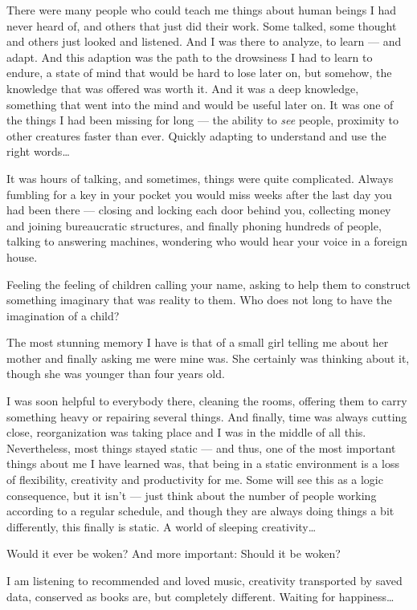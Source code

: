 There were many people who could teach me things about human beings I had never heard of, and others that just did their work. Some talked, some thought and others just looked and listened. And I was there to analyze, to learn --- and adapt. And this adaption was the path to the drowsiness I had to learn to endure, a state of mind that would be hard to lose later on, but somehow, the knowledge that was offered was worth it. And it was a deep knowledge, something that went into the mind and would be useful later on. It was one of the things I had been missing for long --- the ability to \emph{see} people, proximity to other creatures faster than ever. Quickly adapting to understand and use the right words\dots{}

It was hours of talking, and sometimes, things were quite complicated. Always fumbling for a key in your pocket you would miss weeks after the last day you had been there --- closing and locking each door behind you, collecting money and joining bureaucratic structures, and finally phoning hundreds of people, talking to answering machines, wondering who would hear your voice in a foreign house.

Feeling the feeling of children calling your name, asking to help them to construct something imaginary that was reality to them. Who does not long to have the imagination of a child?

The most stunning memory I have is that of a small girl telling me about her mother and finally asking me were mine was. She certainly was thinking about it, though she was younger than four years old.

I was soon helpful to everybody there, cleaning the rooms, offering them to carry something heavy or repairing several things. And finally, time was always cutting close, reorganization was taking place and I was in the middle of all this. Nevertheless, most things stayed static --- and thus, one of the most important things about me I have learned was, that being in a static environment is a loss of flexibility, creativity and productivity for me. Some will see this as a logic consequence, but it isn't --- just think about the number of people working according to a regular schedule, and though they are always doing things a bit differently, this finally is static. A world of sleeping creativity\dots{}

Would it ever be woken? And more important: Should it be woken?

I am listening to recommended and loved music, creativity transported by saved data, conserved as books are, but completely different. Waiting for happiness\dots{}

